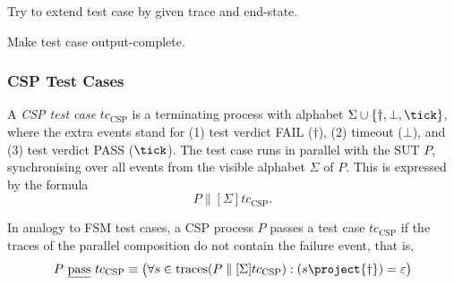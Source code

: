 \begin{algorithm}
\caption{Try to extend test case by given trace and end-state.}
\label{algo:aExtend}
{
}
\end{algorithm}



\begin{algorithm}
\caption{Make test case output-complete.}
\label{algo:aComplete}
{
}
\end{algorithm}



\subsubsection{CSP Test Cases}
\label{sec:csptc}
A \emph{CSP test case} $tc_\text{CSP}$  is a terminating process with alphabet
$\Sigma\cup\{\dag,\bot,\tick \}$, where the extra events stand for
(1) test  verdict FAIL ($\dag$), (2) timeout ($\bot$), and (3) test
 verdict PASS ($\tick$). The test case runs in parallel with the SUT $P$,
 synchronising over all events from the visible alphabet $\Sigma$ of $P$. This is
 expressed by the formula
 \[
 P\parallel[\Sigma] tc_\text{CSP}.
 \]

 In analogy to FSM test cases, a CSP process $P$ passes a test case $tc_\text{CSP}$
 if the traces of the parallel composition do not contain the failure event, that is,
 \[
 P\ \pass\ tc_\text{CSP} \equiv \big(
 \forall s\in\trc(P\parallel[\Sigma] tc_\text{CSP}): (s\project \{\dag\}) = \varepsilon
 \big)
 \]


